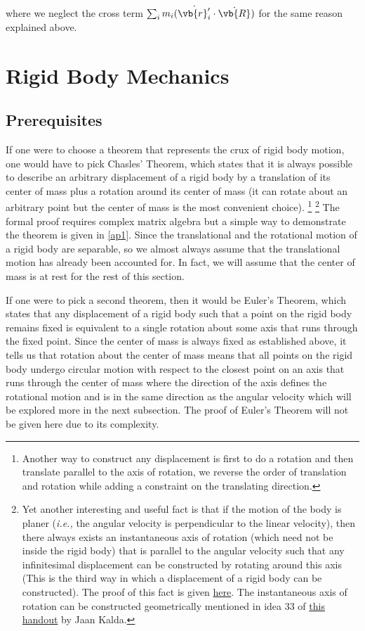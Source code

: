 \documentclass[a4paper,12pt]{report}
\begin{document}
where we neglect the cross term \(\sum_{i}^{} m_{i} (\dot{\vb{r} '_{i} } \cdot \dot{\vb{R} })  \) for the same reason explained above. 




\newpage
\section{Rigid Body Mechanics}
\subsection{Prerequisites}
If one were to choose a theorem that represents the crux of rigid body motion, one would have to pick Chasles' Theorem, which states that it is always possible to describe an arbitrary displacement of a rigid body by a translation of its center of mass plus a rotation around its center of mass (it can rotate about an arbitrary point but the center of mass is the most convenient choice). \footnote{Another way to construct any displacement is first to do a rotation and then translate parallel to the axis of rotation, we reverse the order of translation and rotation while adding a constraint on the translating direction.} \footnote{Yet another interesting and useful fact is that if the motion of the body is planer (\textit{i.e.,} the angular velocity is perpendicular to the linear velocity), then there always exists an instantaneous axis of rotation (which need not be inside the rigid body) that is parallel to the angular velocity such that any infinitesimal displacement can be constructed by rotating around this axis (This is the third way in which a displacement of a rigid body can be constructed). The proof of this fact is given \href{https://physics.stackexchange.com/q/541554}{here}. The instantaneous axis of rotation can be constructed geometrically mentioned in idea 33 of \href{https://www.ioc.ee/~kalda/ipho/kin_ENG.pdf}{this handout} by Jaan Kalda.}  The formal proof requires complex matrix algebra but a simple way to demonstrate the theorem is given in \cref{ap1}. Since the translational and the rotational motion of a rigid body are separable, so we almost always assume that the translational motion has already been accounted for. In fact, we will assume that the center of mass is at rest for the rest of this section.

If one were to pick a second theorem, then it would be Euler's Theorem, which states that any displacement of a rigid body such that a point on the rigid body remains fixed is equivalent to a single rotation about some axis that runs through the fixed point. Since the center of mass is always fixed as established above, it tells us that rotation about the center of mass means that all points on the rigid body undergo circular motion with respect to the closest point on an axis that runs through the center of mass where the direction of the axis defines the rotational motion and is in the same direction as the angular velocity which will be explored more in the next subsection. The proof of Euler's Theorem will not be given here due to its complexity.
\end{document}
